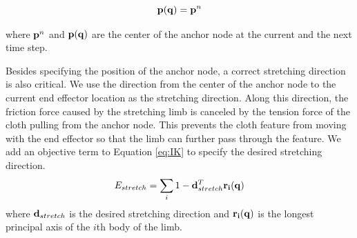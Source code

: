 

\begin{equation}
  \mathbf{p}(\mathbf{q}) = \mathbf{p}^n
  \label{eq:fixtureNode}
\end{equation}

where $\mathbf{p}^n$ and $\mathbf{p(q)}$ are the center of the anchor node at the current and the next time step.

Besides specifying the position of the anchor node, a correct stretching direction is also critical. We use the direction from the center of the anchor node to the current end effector location as the stretching direction. Along this direction, the friction force caused by the stretching limb is canceled by the tension force of the cloth pulling from the anchor node. This prevents the cloth feature from moving with the end effector so that the limb can further pass through the feature. We add an objective term to Equation \ref{eq:IK} to specify the desired stretching direction.
\begin{equation}
  E_{stretch} = \sum_i1 - \mathbf{d}_{stretch}^T\mathbf{r_i(q)}
  \label{eq:stretching}
\end{equation}
where $\mathbf{d}_{stretch}$ is the desired stretching direction and $\mathbf{r_i(q)}$ is the longest principal axis of the $i$th body of the limb. 

